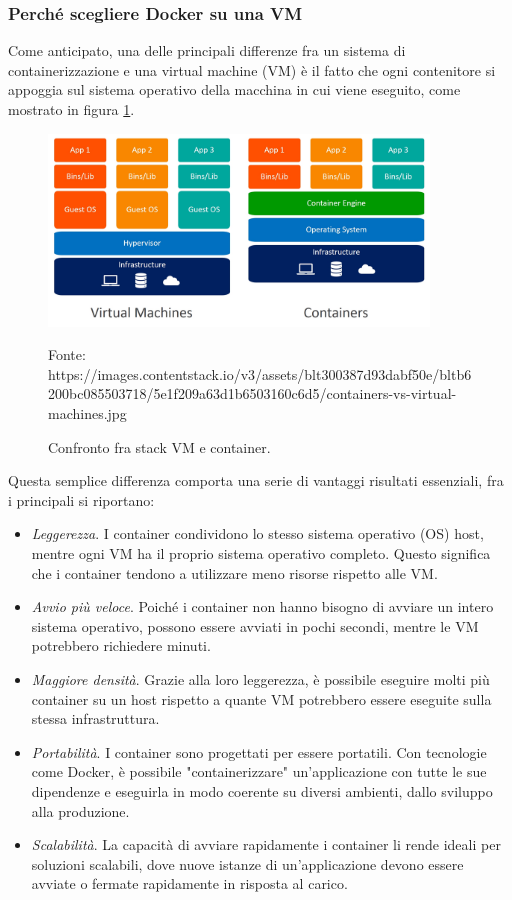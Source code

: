 \documentclass[12pt,a4paper,twoside,openright]{book}
\begin{document}
\subsubsection{Perché scegliere Docker su una VM}
Come anticipato, una delle principali differenze fra un sistema di containerizzazione e una virtual machine (VM) è il fatto che ogni contenitore si appoggia sul sistema operativo della macchina in cui viene eseguito, come mostrato in figura \ref{fig:docker-vm}. 

\begin{figure}
    \centering
    \includegraphics[width=0.9\textwidth]{images/container-vm.png}
    \caption{Confronto fra stack VM e container.}
    \label{fig:docker-vm}
    \tiny{Fonte: https://images.contentstack.io/v3/assets/blt300387d93dabf50e/bltb6200bc085503718/5e1f209a63d1b6503160c6d5/containers-vs-virtual-machines.jpg}
\end{figure}

Questa semplice differenza comporta una serie di vantaggi risultati essenziali, fra i principali si riportano:

\begin{itemize}
    \item \emph{Leggerezza}. I container condividono lo stesso sistema operativo (OS) host, mentre ogni VM ha il proprio sistema operativo completo. Questo significa che i container tendono a utilizzare meno risorse rispetto alle VM.
    \item \emph{Avvio più veloce}. Poiché i container non hanno bisogno di avviare un intero sistema operativo, possono essere avviati in pochi secondi, mentre le VM potrebbero richiedere minuti.
    \item \emph{Maggiore densità}. Grazie alla loro leggerezza, è possibile eseguire molti più container su un host rispetto a quante VM potrebbero essere eseguite sulla stessa infrastruttura. 
    \item \emph{Portabilità}. I container sono progettati per essere portatili. Con tecnologie come Docker, è possibile "containerizzare" un'applicazione con tutte le sue dipendenze e eseguirla in modo coerente su diversi ambienti, dallo sviluppo alla produzione.
    \item \emph{Scalabilità}. La capacità di avviare rapidamente i container li rende ideali per soluzioni scalabili, dove nuove istanze di un'applicazione devono essere avviate o fermate rapidamente in risposta al carico.
\end{itemize}
\end{document}
